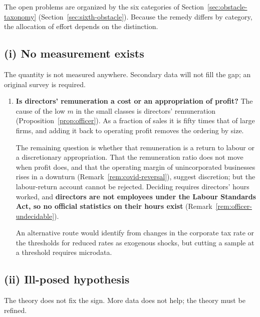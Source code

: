 The open problems are organized by the six categories of
Section~\ref{sec:obstacle-taxonomy} (Section~\ref{sec:sixth-obstacle}). Because the remedy
differs by category, the allocation of effort depends on the distinction.

\subsection{(i) No measurement exists}

The quantity is not measured anywhere. Secondary data will not fill the gap; an original
survey is required.

\begin{enumerate}[label=(\arabic*)]
\item \textbf{Is directors' remuneration a cost or an appropriation of profit?}
The cause of the low $m$ in the small classes is directors' remuneration
(Proposition~\ref{prop:officer}). As a fraction of sales it is fifty times that of large
firms, and adding it back to operating profit removes the ordering by size.

The remaining question is whether that remuneration is a return to labour or a discretionary
appropriation. That the remuneration ratio does not move when profit does, and that the
operating margin of unincorporated businesses rises in a downturn
(Remark~\ref{rem:covid-reversal}), suggest discretion; but the labour-return account cannot
be rejected. Deciding requires directors' hours worked, and
\textbf{directors are not employees under the Labour Standards Act, so no official statistics
on their hours exist} (Remark~\ref{rem:officer-undecidable}).

An alternative route would identify from changes in the corporate tax rate or the thresholds
for reduced rates as exogenous shocks, but cutting a sample at a threshold requires
microdata.
\end{enumerate}

\subsection{(ii) Ill-posed hypothesis}

The theory does not fix the sign. More data does not help; the theory must be refined.

